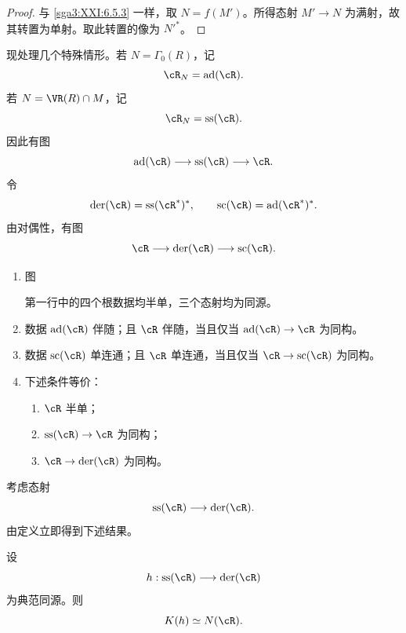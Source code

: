 \begin{proof}
与 \ref{sga3:XXI:6.5.3} 一样，取 \(N=f(M')\)。所得态射 \(M'\to N\) 为满射，故其转置为单射。取此转置的像为 \(N'^\ast\)。
\end{proof}

现处理几个特殊情形。若 \(N=\Gamma_0(R)\)，记
\[
 \cR_N=\operatorname{ad}(\cR).
\]
若 \(N=\VR(R)\cap M\)，记
\[
 \cR_N=\operatorname{ss}(\cR).
\]
因此有图
\[
 \operatorname{ad}(\cR)\longrightarrow
 \operatorname{ss}(\cR)\longrightarrow\cR.
\]
令
\[
 \operatorname{der}(\cR)=\operatorname{ss}(\cR^\ast)^\ast,
 \qquad
 \operatorname{sc}(\cR)=\operatorname{ad}(\cR^\ast)^\ast.
\]
由对偶性，有图
\[
 \cR\longrightarrow
 \operatorname{der}(\cR)\longrightarrow
 \operatorname{sc}(\cR).
\]

\begin{proposition}\label{sga3:XXI:6.5.5}
\begin{enumerate}
\item[(i)] 图
\begin{center}
\end{center}
第一行中的四个根数据均半单，三个态射均为同源。
\item[(ii)] 数据 \(\operatorname{ad}(\cR)\) 伴随；且 \(\cR\) 伴随，当且仅当 \(\operatorname{ad}(\cR)\to\cR\) 为同构。
\item[(iii)] 数据 \(\operatorname{sc}(\cR)\) 单连通；且 \(\cR\) 单连通，当且仅当 \(\cR\to\operatorname{sc}(\cR)\) 为同构。
\item[(iv)] 下述条件等价：
\begin{enumerate}
\item[(a)] \(\cR\) 半单；
\item[(b)] \(\operatorname{ss}(\cR)\to\cR\) 为同构；
\item[(c)] \(\cR\to\operatorname{der}(\cR)\) 为同构。
\end{enumerate}
\end{enumerate}
\end{proposition}

考虑态射
\[
 \operatorname{ss}(\cR)\longrightarrow\operatorname{der}(\cR).
\]
由定义立即得到下述结果。

\begin{lemma}\label{sga3:XXI:6.5.6}
设
\[
 h:\operatorname{ss}(\cR)\longrightarrow\operatorname{der}(\cR)
\]
为典范同源。则
\[
 K(h)\simeq N(\cR).
\]
\end{lemma}

